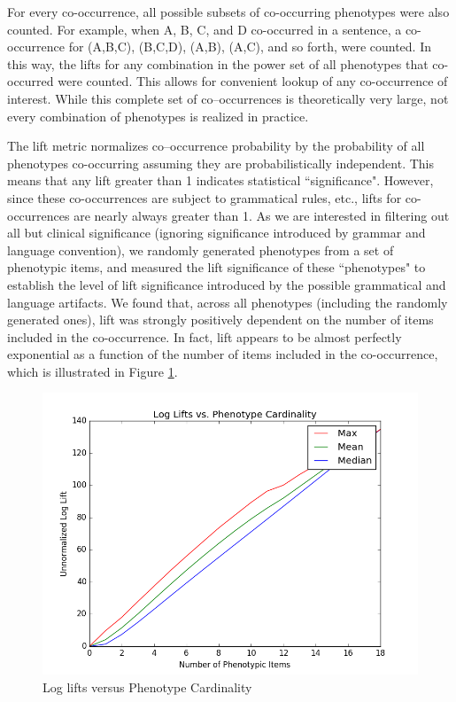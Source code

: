 \documentclass{sig-alternate-05-2015}
\begin{document}
For every co-occurrence, all possible subsets of co-occurring phenotypes were also counted.
For example, when A, B, C, and D co-occurred in a sentence, a co-occurrence for (A,B,C), (B,C,D), (A,B), (A,C), and so forth, were counted.
In this way, the lifts for any combination in the power set of all phenotypes that co-occurred were counted.
This allows for convenient lookup of any co-occurrence of interest.
While this complete set of co--occurrences is theoretically very large, not every combination of phenotypes is realized in practice.

The lift metric normalizes co--occurrence probability by the probability of all phenotypes co-occurring assuming they are probabilistically independent.
This means that any lift greater than 1 indicates statistical ``significance".
However, since these co-occurrences are subject to grammatical rules, etc., lifts for co-occurrences are nearly always greater than 1.
As we are interested in filtering out all but clinical significance (ignoring significance introduced by grammar and language convention), we randomly generated phenotypes from a set of phenotypic items, and measured the lift significance of these ``phenotypes" to establish the level of lift significance introduced by the possible grammatical and language artifacts.
We found that, across all phenotypes (including the randomly generated ones), lift was strongly positively dependent on the number of items included in the co-occurrence.
In fact, lift appears to be almost perfectly exponential as a function of the number of items included in the co-occurrence, which is illustrated in Figure \ref{fig:log-lift}.


\begin{figure} [t]
\centering
\includegraphics[width=\linewidth]{logLiftsAcrossPhenoCard_MMM_kho.png}
\caption{Log lifts versus Phenotype Cardinality}
\label{fig:log-lift}
\end{figure}
\end{document}
